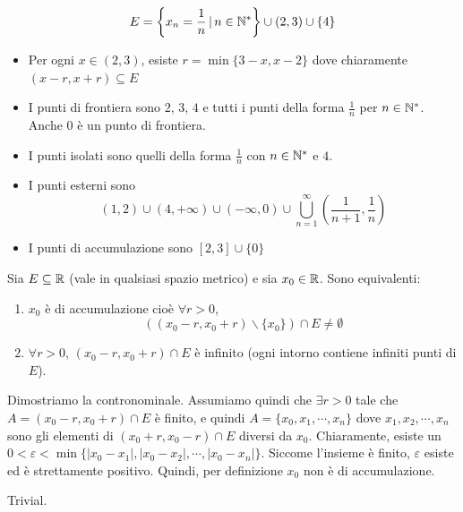 \documentclass[a4paper]{article}
\begin{document}
\begin{radioactive}
\[
    E = \left\{ x_n = \frac{1}{n} \,|\, n\in {\mathbb{N}}^* \right\} \cup (2,3) \cup \{4\}
\]
\begin{itemize}
    \item Per ogni \(x\in (2,3)\), esiste \(r = \min\{3-x, x-2\}\)
    dove chiaramente \((x-r, x+r) \subseteq E\)
    \item I punti di frontiera sono \(2\), \(3\), \(4\) e tutti i punti della forma \(\frac{1}{n}\) per \(n\in {\mathbb{N}}^*\).
    Anche \(0\) è un punto di frontiera.
    \item I punti isolati sono quelli della forma \(\frac{1}{n}\) con \(n\in {\mathbb{N}}^*\) e \(4\).
    \item I punti esterni sono
    \[
        (1,2) \cup (4,+\infty) \cup (-\infty, 0) \cup \bigcup_{n=1}^\infty \left(\frac{1}{n+1}, \frac{1}{n}\right)
    \]
    \item I punti di accumulazione sono
    \([2,3] \cup \{0\} \)
\end{itemize}

\begin{snippettheorem}{}
    Sia \(E \subseteq \mathbb{R}\) (vale in qualsiasi spazio metrico)
    e sia \(x_0 \in \mathbb{R}\). Sono equivalenti:
    \begin{enumerate}
        \item \(x_0\) è di accumulazione cioè \(\forall r > 0\), \[\left((x_0-r,x_0+r) \backslash \{x_0\}\right) \cap E \neq \emptyset\]
        \item \(\forall r>0\), \((x_0 -r, x_0 + r) \cap E\) è infinito (ogni intorno contiene infiniti punti di \(E\)).
    \end{enumerate}
\end{snippettheorem}

\begin{snippetproof}{}
    \begin{iffproof}
        \item Dimostriamo la contronominale.
        Assumiamo quindi che \(\exists r > 0\) tale che \(A=(x_0 -r, x_0 + r) \cap E\) è finito,
        e quindi \(A = \{ x_0, x_1, \cdots, x_n \}\) dove \(x_1, x_2, \cdots, x_n\)
        sono gli elementi di \((x_0 + r, x_0 - r) \cap E\) diversi da \(x_0\).
        Chiaramente, esiste un \(0 < \varepsilon < \min\{ |x_0 - x_1|, |x_0 - x_2|, \cdots, |x_0 - x_n| \}\).
        Siccome l'insieme è finito, \(\varepsilon\) esiste ed è strettamente positivo.
        Quindi, per definizione \(x_0\) non è di accumulazione.
        \item Trivial.
    \end{iffproof}
\end{snippetproof}
\end{radioactive}
\end{document}
